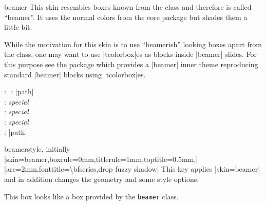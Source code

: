 \begin{docSkin}{beamer}
  This skin resembles boxes known from the  class and therefore is
  called \enquote{beamer}. It uses the normal colors from the core package but shades
  them a little bit.\par
  While the motivation for this skin is to use \enquote{beamerish} looking
  boxes apart from the  class, one may want to use |tcolorbox|es
  as blocks inside |beamer| slides. For this purpose see the package 
  which provides a |beamer| inner theme reproducing standard |beamer| blocks using |tcolorbox|es.
\begin{tcolorbox}[skintable=beamer]
  \begin{tabbing}
    : \=\kill
    :           \> |path|\\
    : \> \emph{special}\\ 
    :        \> \emph{special}\\
    :    \> \emph{special}\\
    :           \> |path|
  \end{tabbing}
\end{tcolorbox}
\end{docSkin}



\begin{docTcbKey}{beamer}{}{style, initially\\
  |skin=beamer,boxrule=0mm,titlerule=1mm,toptitle=0.5mm,|\\
  |arc=2mm,fonttitle=\textbackslash bfseries,drop fuzzy shadow|
}
  This key applies |skin=beamer| and in addition changes the geometry and some style options.
\end{docTcbKey}



\begin{dispExample}
\end{dispExample}



\begin{dispExample}
\begin{tcolorbox}[beamer,colback=Salmon!50!white,colframe=FireBrick!75!black,
  adjusted title=A colored box with the \enquote{beamer} skin]
This box looks like a box provided by the \texttt{beamer} class.
\end{tcolorbox}
\end{dispExample}


